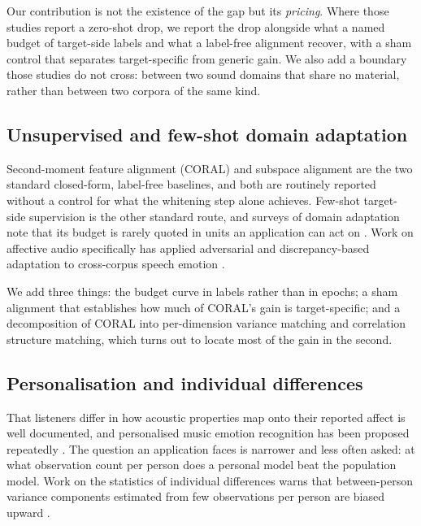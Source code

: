 Our contribution is not the existence of the gap but its \emph{pricing}. Where
those studies report a zero-shot drop, we report the drop alongside what a
named budget of target-side labels and what a label-free alignment recover,
with a sham control that separates target-specific from generic gain. We also
add a boundary those studies do not cross: between two sound domains that
share no material, rather than between two corpora of the same kind.

\subsection{Unsupervised and few-shot domain adaptation}

Second-moment feature alignment (CORAL) \cite{sun2016coral} and subspace
alignment \cite{fernando2013subspace} are the two standard closed-form,
label-free baselines, and both are routinely reported without a control for
what the whitening step alone achieves. Few-shot target-side supervision is
the other standard route, and surveys of domain adaptation note that its
budget is rarely quoted in units an application can act on
\cite{wang2018deepda}. Work on affective audio specifically has applied
adversarial and discrepancy-based adaptation to cross-corpus speech emotion
\cite{abdelwahab2018domain}.

We add three things: the budget curve in labels rather than in epochs; a sham
alignment that establishes how much of CORAL's gain is target-specific; and a
decomposition of CORAL into per-dimension variance matching and correlation
structure matching, which turns out to locate most of the gain in the second.

\subsection{Personalisation and individual differences}

That listeners differ in how acoustic properties map onto their reported
affect is well documented, and personalised music emotion recognition has been
proposed repeatedly \cite{yang2007individuality, yang2009personalized, chen2014personalized}. The
question an application faces is narrower and less often asked: at what
observation count per person does a personal model beat the population model.
Work on the statistics of individual differences warns that between-person
variance components estimated from few observations per person are biased
upward \cite{rouder2019psychometrics}.

